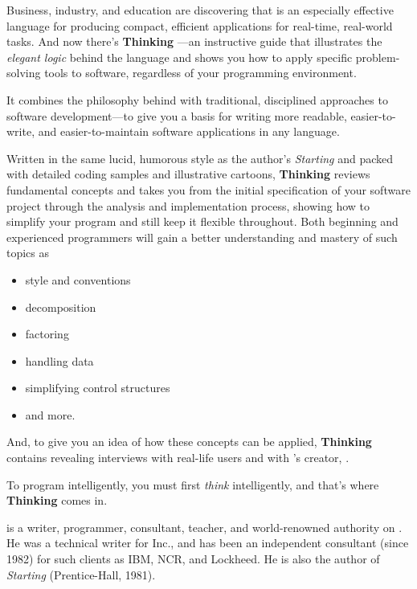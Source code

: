 
\noindent
Business, industry, and education are discovering that \Forth{} is an
especially effective language for producing compact, efficient
applications for real-time, real-world tasks. And now there's
\textbf{Thinking \Forth}---an instructive guide that illustrates the
\emph{elegant logic} behind the language and shows you how to apply
specific problem-solving tools to software, regardless of your
programming environment.

It combines the philosophy behind \Forth{} with traditional,
disciplined approaches to software development---to give you a basis
for writing more readable, easier-to-write, and easier-to-maintain
software applications in any language.

Written in the same lucid, humorous style as the author's
\emph{Starting \Forth} and packed with detailed coding samples and
illustrative cartoons, \textbf{Thinking \Forth} reviews fundamental
\Forth{} concepts and takes you from the initial specification of your
software project through the analysis and implementation process,
showing how to simplify your program and still keep it flexible
throughout. Both beginning and experienced programmers will gain a
better understanding and mastery of such topics as
\begin{itemize}
\item \Forth{} style and conventions
\item decomposition
\item factoring
\item handling data
\item simplifying control structures
\item and more.
\end{itemize}

And, to give you an idea of how these concepts can be applied,
\textbf{Thinking \Forth} contains revealing interviews with real-life
users and with \Forth's creator, .

To program intelligently, you must first \emph{think} intelligently,
and that's where \textbf{Thinking \Forth} comes in.

\textbf{} is a writer, programmer, consultant,
teacher, and world-renowned authority on \Forth. He was a technical
writer for \Forth{} Inc., and has been an independent consultant
(since 1982) for such clients as IBM, NCR, and Lockheed. He is also
the author of \emph{Starting \Forth} (Prentice-Hall, 1981).
